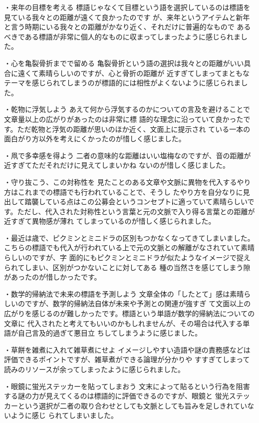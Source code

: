 ・来年の目標を考える
標語じゃなくて目標という語を選択しているのは標語を見ている我々との距離が遠くて良かったのです
が、来年というアイテムと新年と言う時期にいる我々との距離がかなり近く、それだけに普遍的なもので
あるべきである標語が非常に個人的なものに収まってしまったように感じられました。

・心を亀裂骨折までで留める
亀裂骨折という語の選択は我々との距離がいい具合に遠くて素晴らしいのですが、心と骨折の距離が
近すぎてしまってまともなテーマを感じられてしまうのが標語的には相性がよくないように感じられまし
た。

・乾物に浮気しよう
あえて何から浮気するのかについての言及を避けることで文章量以上の広がりがあったのは非常に標
語的な理念に沿っていて良かったです。ただ乾物と浮気の距離が思いのほか近く、文面上に提示され
ている一本の面白がり方以外を考えにくかったのが惜しく感じました。

・凧で多幸感を得よう
二者の意味的な距離はいい塩梅なのですが、音の距離が近すぎてただそれだけに見えてしまいかね
ないのが惜しく感じました。

・守り抜こう、この対称性を
見たことのある文章や文脈に異物を代入するやり方はこれまでの標語でも行われていることで、そうし
たやり方を自分なりに見出して踏襲している点はこの公募会というコンセプトに適っていて素晴らしいで
す。ただし、代入された対称性という言葉と元の文脈で入り得る言葉との距離が近すぎて異物感が薄れ
てしまっているのが惜しく感じられました。

・最近は歳で、ピクミンとミニドラの区別もつかなくなってきてしまいました。
こちらの標語でも代入が行われている上で元の文脈との解離がなされていて素晴らしいのですが、字
面的にもピクミンとミニドラが似たようなイメージで捉えられてしまい、区別がつかないことに対してある
種の当然さを感じてしまう隙があったのが惜しかったです。

・数学的帰納法で未来の標語を予測しよう
文章全体の「したとて」感は素晴らしいのですが、数学的帰納法自体が未来や予測との関連が強すぎ
て文面以上の広がりを感じるのが難しかったです。標語という単語が数学的帰納法についての文章に
代入されたと考えてもいいのかもしれませんが、その場合は代入する単語が自己言及的過ぎて悪目立
ちしてしまうように感じました。

・草餅を雑煮に入れて雑草煮にせよ
イメージしやすい造語や謎の責務感などは評価できるポイントですが、雑草煮ができる論理が分かりや
すすぎてしまって読みのリソースが余ってしまったように感じられました。

・眼鏡に蛍光ステッカーを貼ってしまおう
文末によって貼るという行為を阻害する謎の力が見えてくるのは標語的に評価できるのですが、眼鏡と
蛍光ステッカーという選択が二者の取り合わせとしても文脈としても旨みを足しきれていないように感じ
られてしまいました。

